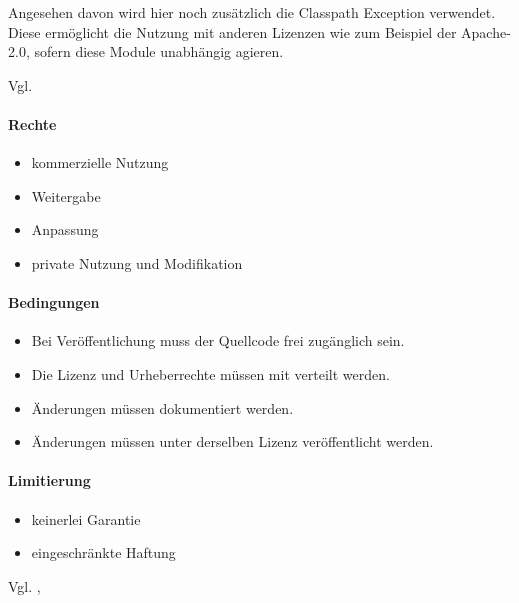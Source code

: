 Angesehen davon wird hier noch zusätzlich die Classpath Exception verwendet.
Diese ermöglicht die Nutzung mit anderen Lizenzen wie zum Beispiel der Apache-2.0,
sofern diese Module unabhängig agieren.

Vgl. \cite{gnu-classPath}

\paragraph{Rechte}
\begin{itemize}
    \item kommerzielle Nutzung
    \item Weitergabe
    \item Anpassung
    \item private Nutzung und Modifikation
\end{itemize}
\paragraph{Bedingungen}
\begin{itemize}
    \item Bei Veröffentlichung muss der Quellcode frei zugänglich sein.
    \item Die Lizenz und Urheberrechte müssen mit verteilt werden.
    \item Änderungen müssen dokumentiert werden.
    \item Änderungen müssen unter derselben Lizenz veröffentlicht werden.
\end{itemize}

\paragraph{Limitierung}
\begin{itemize}
    \item keinerlei Garantie
    \item eingeschränkte Haftung
\end{itemize}
Vgl. \cite{choosealicense-com}, \cite{gnu-why-upgrade-gplv3}


